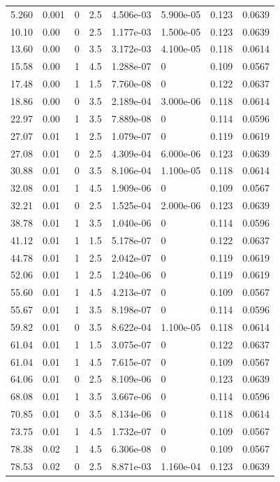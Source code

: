 \documentclass[preview]{standalone}
\begin{document}
{{\begin{tabular}{L{1.2cm}C{1.2cm} C{0.3cm}C{0.5cm} C{1.4cm}C{1.4cm} C{1.4cm}C{1.4cm}}
  5.260  &  0.001  & 0     & 2.5 &  4.506e-03  & 5.900e-05  & 0.123 &  0.0639   \\ 
  10.10  &  0.00  & 0     & 2.5 &  1.177e-03  & 1.500e-05  & 0.123 &  0.0639   \\ 
  13.60  &  0.00  & 0     & 3.5 &  3.172e-03  & 4.100e-05  & 0.118 &  0.0614   \\ 
  15.58  &  0.00  & 1     & 4.5 &  1.288e-07  & 0  & 0.109 &  0.0567   \\ 
  17.48  &  0.00  & 1     & 1.5 &  7.760e-08  & 0  & 0.122 &  0.0637   \\ 
  18.86  &  0.00  & 0     & 3.5 &  2.189e-04  & 3.000e-06  & 0.118 &  0.0614   \\ 
  22.97  &  0.00  & 1     & 3.5 &  7.889e-08  & 0  & 0.114 &  0.0596   \\ 
  27.07  &  0.01  & 1     & 2.5 &  1.079e-07  & 0  & 0.119 &  0.0619   \\ 
  27.08  &  0.01  & 0     & 2.5 &  4.309e-04  & 6.000e-06  & 0.123 &  0.0639   \\ 
  30.88  &  0.01  & 0     & 3.5 &  8.106e-04  & 1.100e-05  & 0.118 &  0.0614   \\ 
  32.08  &  0.01  & 1     & 4.5 &  1.909e-06  & 0  & 0.109 &  0.0567   \\ 
  32.21  &  0.01  & 0     & 2.5 &  1.525e-04  & 2.000e-06  & 0.123 &  0.0639   \\ 
  38.78  &  0.01  & 1     & 3.5 &  1.040e-06  & 0  & 0.114 &  0.0596   \\ 
  41.12  &  0.01  & 1     & 1.5 &  5.178e-07  & 0  & 0.122 &  0.0637   \\ 
  44.78  &  0.01  & 1     & 2.5 &  2.042e-07  & 0  & 0.119 &  0.0619   \\ 
  52.06  &  0.01  & 1     & 2.5 &  1.240e-06  & 0  & 0.119 &  0.0619   \\ 
  55.60  &  0.01  & 1     & 4.5 &  4.213e-07  & 0  & 0.109 &  0.0567   \\ 
  55.67  &  0.01  & 1     & 3.5 &  8.198e-07  & 0  & 0.114 &  0.0596   \\ 
  59.82  &  0.01  & 0     & 3.5 &  8.622e-04  & 1.100e-05  & 0.118 &  0.0614   \\ 
  61.04  &  0.01  & 1     & 1.5 &  3.075e-07  & 0  & 0.122 &  0.0637   \\ 
  61.04  &  0.01  & 1     & 4.5 &  7.615e-07  & 0  & 0.109 &  0.0567   \\ 
  64.06  &  0.01  & 0     & 2.5 &  8.109e-06  & 0  & 0.123 &  0.0639   \\ 
  68.08  &  0.01  & 1     & 3.5 &  3.667e-06  & 0  & 0.114 &  0.0596   \\ 
  70.85  &  0.01  & 0     & 3.5 &  8.134e-06  & 0  & 0.118 &  0.0614   \\ 
  73.75  &  0.01  & 1     & 4.5 &  1.732e-07  & 0  & 0.109 &  0.0567   \\ 
  78.38  &  0.02  & 1     & 4.5 &  6.306e-08  & 0  & 0.109 &  0.0567   \\ 
  78.53  &  0.02  & 0     & 2.5 &  8.871e-03  & 1.160e-04  & 0.123 &  0.0639   \\ 
\hline 
\end{tabular} 

}}
\end{document}
